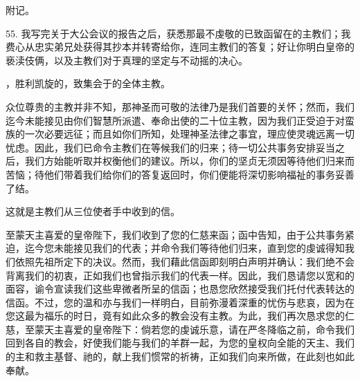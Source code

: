 附记。\par

55. 我写完关于大公会议的报告之后，获悉那最不虔敬的已致函留在的主教们；我费心从忠实弟兄处获得其抄本并转寄给你，连同主教们的答复；好让你明白皇帝的亵渎伎俩，以及主教们对于真理的坚定与不动摇的决心。\par

\par

，胜利凯旋的，致集会于的全体主教。\par

众位尊贵的主教并非不知，那神圣而可敬的法律乃是我们首要的关怀；然而，我们迄今未能接见由你们智慧所派遣、奉命出使的二十位主教，因为我们正受迫于对蛮族的一次必要远征；而且如你们所知，处理神圣法律之事宜，理应使灵魂远离一切忧虑。因此，我们已命令主教们在等候我们的归来；待一切公共事务安排妥当之后，我们方始能听取并权衡他们的建议。所以，你们的坚贞无须因等待他们归来而苦恼；待他们带着我们给你们的答复返回时，你们便能将深切影响福祉的事务妥善了结。\par

这就是主教们从三位使者手中收到的信。\par

\par

至蒙天主喜爱的皇帝陛下，我们收到了您的仁慈来函；函中告知，由于公共事务紧迫，迄今您未能接见我们的代表；并命令我们等待他们归来，直到您的虔诚得知我们依照先祖所定下的决议。然而，我们藉此信函即刻明白声明并确认：我们绝不会背离我们的初衷，正如我们也曾指示我们的代表一样。因此，我们恳请您以宽和的面容，谕令宣读我们这些卑微者所呈的信函；也恳您欣然接受我们托付代表转达的信函。不过，您的温和亦与我们一样明白，目前弥漫着深重的忧伤与悲哀，因为在您这最为福乐的时日，竟有如此众多的教会没有主教。为此，我们再次恳求您的仁慈，至蒙天主喜爱的皇帝陛下：倘若您的虔诚乐意，请在严冬降临之前，命令我们回到各自的教会，好使我们能与我们的羊群一起，为您的皇权向全能的天主、我们的主和救主基督、祂的，献上我们惯常的祈祷，正如我们向来所做，在此刻也如此奉献。\par

